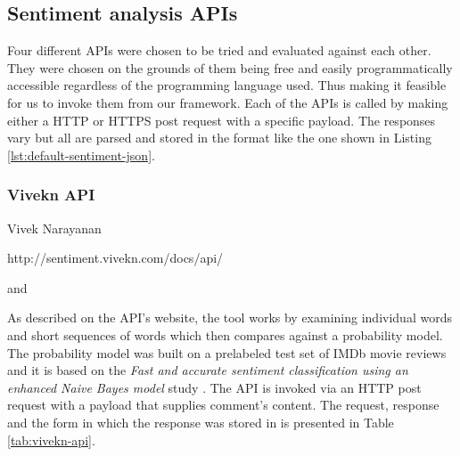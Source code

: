 \newcommand*{\APIsOverviewPath}{04-framework/02-implementation/02-apis}

\subsection{Sentiment analysis APIs\label{sec:apis}}
Four different APIs were chosen to be tried and  evaluated against each other. 
They were chosen on the grounds of them being free and easily programmatically accessible regardless of the programming language used.
Thus making it feasible for us to invoke them from our framework.
Each of the APIs is called by making either a HTTP or HTTPS post request with a specific payload. The responses vary but all are parsed and stored in the format like the one shown in Listing \ref{lst:default-sentiment-json}.

\subsubsection*{Vivekn API}

\begin{description}
\singlespacing
 \item[Author:] Vivek Narayanan
 \item[Web url:] http://sentiment.vivekn.com/docs/api/
 \item[Database columns:]  and 
\end{description}
As described on the API's website, the tool works by examining individual words and short sequences of words which then compares against a probability model. The probability model was built on a prelabeled test set of IMDb movie reviews
and it is based on the \emph{Fast and accurate sentiment classification using an enhanced Naive Bayes model} study \cite{DBLP:journals/corr/abs-1305-6143}.
The API is invoked via an HTTP post request with a  payload that supplies comment's content. 
The request, response and the form in which the response was stored in  is presented in Table \ref{tab:vivekn-api}.


\restoregeometry


